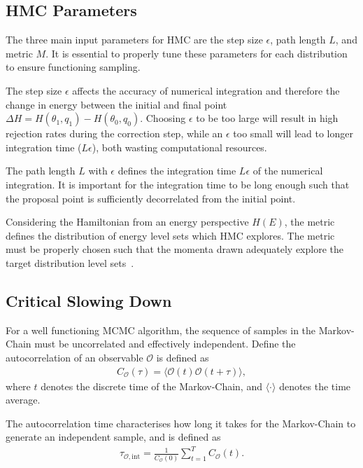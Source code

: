 \documentclass[11pt]{article}
\begin{document}
\subsection{HMC Parameters}\label{subsec:hmc_params}
    The three main input parameters for HMC are the step size $\epsilon$, path length $L$, and metric $M$.
    It is essential to properly tune these parameters for each distribution to ensure functioning sampling.

    The step size $\epsilon$ affects the accuracy of numerical integration and therefore the change in energy between the initial
    and final point $\Delta H = H(\theta_1, q_1) - H(\theta_0, q_0)$.
    Choosing $\epsilon$ to be too large will result in high rejection rates during the correction step,
    while an $\epsilon$ too small will lead to longer integration
    time ($L\epsilon$), both wasting computational resources.

    The path length $L$ with $\epsilon$ defines the integration time $L\epsilon$ of the numerical integration.
    It is important for the integration time to be long enough such that the proposal point is sufficiently decorrelated
    from the initial point.

    Considering the Hamiltonian from an energy perspective $H(E)$, the metric defines the distribution of energy level
    sets which HMC explores.
    The metric must be properly chosen such that the momenta drawn adequately explore the target distribution level
    sets~\cite{betancourt2016energymetric}.

\subsection{Critical Slowing Down}\label{subsec:critical_slowing}
    For a well functioning MCMC algorithm, the sequence of samples in the Markov-Chain must be uncorrelated and
    effectively independent.
    Define the autocorrelation of an observable $\mathcal{O}$ is defined as
    \begin{equation}\label{eq:autocorrelation}
    \begin{aligned}
        C_{\mathcal{O}}(\tau) = \langle \mathcal{O}(t) \mathcal{O}(t + \tau) \rangle,
    \end{aligned}
    \end{equation}
    where $t$ denotes the discrete time of the Markov-Chain, and $\langle \cdot \rangle$ denotes the time average.

    The autocorrelation time characterises how long it takes for the Markov-Chain to generate an independent sample,
    and is defined as
    \begin{equation}\label{eq:autocorrelation_time}
    \begin{aligned}
        \tau_{\mathcal{O}, \text{int}} = \frac{1}{C_{\mathcal{O}}(0)} \sum_{t=1}^T C_{\mathcal{O}}(t).
    \end{aligned}
    \end{equation}
\end{document}
